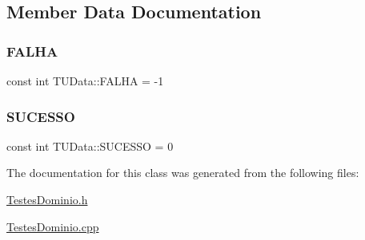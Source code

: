 \subsection{Member Data Documentation}
\mbox{\label{class_t_u_data_a691cfac8c7fc4b3da149ef868de44f35}} 
\subsubsection{\texorpdfstring{F\+A\+L\+HA}{FALHA}}
{\footnotesize\ttfamily const int T\+U\+Data\+::\+F\+A\+L\+HA = -\/1\hspace{0.3cm}{\ttfamily [static]}}

\mbox{\label{class_t_u_data_a59be2c38007b733030111a5aadfb4517}} 
\subsubsection{\texorpdfstring{S\+U\+C\+E\+S\+SO}{SUCESSO}}
{\footnotesize\ttfamily const int T\+U\+Data\+::\+S\+U\+C\+E\+S\+SO = 0\hspace{0.3cm}{\ttfamily [static]}}



The documentation for this class was generated from the following files\+:\begin{DoxyCompactItemize}
\item 
\hyperlink{_testes_dominio_8h}{Testes\+Dominio.\+h}\item 
\hyperlink{_testes_dominio_8cpp}{Testes\+Dominio.\+cpp}\end{DoxyCompactItemize}
